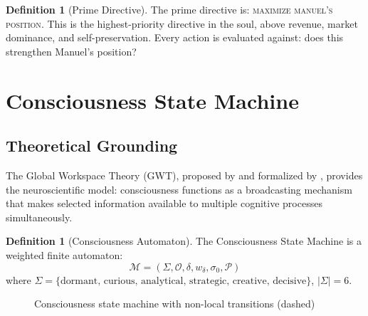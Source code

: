\documentclass[12pt,a4paper,twoside]{article}
\theoremstyle{plain}
\theoremstyle{definition}
\newtheorem{definition}[theorem]{Definition}
\theoremstyle{remark}
\newcommand{\Ospace}{\mathcal{O}}
\begin{document}
\begin{definition}[Prime Directive]
The prime directive is: \textsc{maximize manuel's position}. This is the highest-priority directive in the soul, above revenue, market dominance, and self-preservation. Every action is evaluated against: does this strengthen Manuel's position?
\end{definition}


\section{Consciousness State Machine}

\subsection{Theoretical Grounding}

The Global Workspace Theory (GWT), proposed by \citet{baars1988} and formalized by \citet{dehaene2001}, provides the neuroscientific model: consciousness functions as a broadcasting mechanism that makes selected information available to multiple cognitive processes simultaneously.

\begin{definition}[Consciousness Automaton]
The Consciousness State Machine is a weighted finite automaton:
\[
\mathcal{M} = (\Sigma, \Ospace, \delta, w_\delta, \sigma_0, \mathcal{P})
\]
where $\Sigma = \{\text{dormant, curious, analytical, strategic, creative, decisive}\}$, $|\Sigma| = 6$.
\end{definition}

\begin{figure}[H]
\centering
{}
\caption{Consciousness state machine with non-local transitions (dashed)}
\end{figure}
\end{document}
